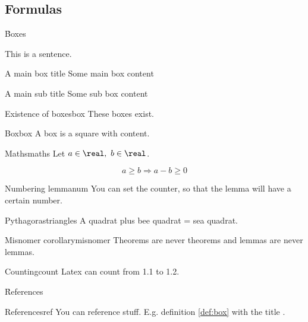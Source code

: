 \def\lutilpath{../..}





\begin{multicols*}{3}

  \part{Formulas}

  \h{Boxes}


  This is a sentence.

  \begin{mainbox}{A main box title}
    Some main box content
  \end{mainbox}

  \begin{subbox}{A main sub title}
    Some sub box content
  \end{subbox}


  \begin{axiom}{Existence of boxes}{box}
    These boxes exist.
  \end{axiom}

  \begin{definition}{Box}{box}
    A box is a square with content.
  \end{definition}

  \begin{corollary}{Maths}{maths}
    Let $a \in \real,\ b \in \real$.

    \[
      a \geq b \Rightarrow a - b \geq 0
    \]
  \end{corollary}

  \begin{lemma}{Numbering lemma}{num}
    You can set the counter, so that the lemma will have a certain number.
  \end{lemma}

  \begin{satz}{Pythagoras}{triangles}
    A quadrat plus bee quadrat = sea quadrat.
  \end{satz}

  \begin{theorem}{Misnomer corollary}{misnomer}
    Theorems are never theorems and lemmas are never lemmas.
  \end{theorem}


  \begin{axiom}{Counting}{count}
    Latex can count from 1.1 to 1.2.
  \end{axiom}

  \h{References}

  \begin{corollary}{References}{ref}
    You can reference stuff. E.g. definition \ref{def:box} with the title .
  \end{corollary}

\end{multicols*}


